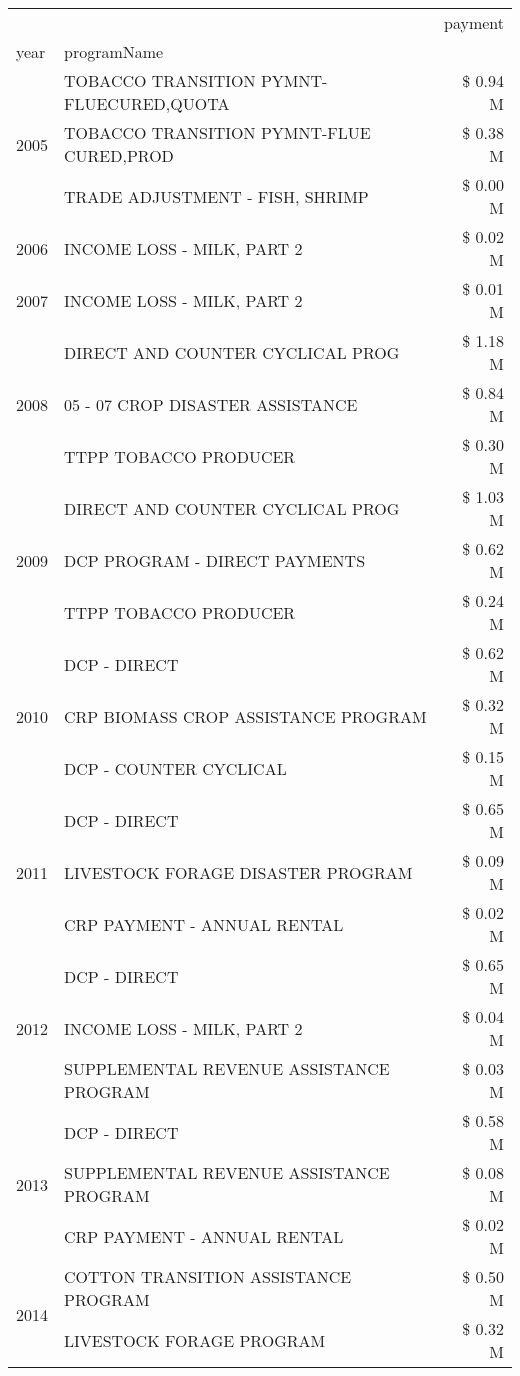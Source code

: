 \begin{tabular}{llr}
\toprule
 &  & payment \\
year & programName &  \\
\midrule
\multirow[t]{3}{*}{2005} & TOBACCO TRANSITION PYMNT-FLUECURED,QUOTA & \$ 0.94 M \\
 & TOBACCO TRANSITION PYMNT-FLUE CURED,PROD & \$ 0.38 M \\
 & TRADE ADJUSTMENT - FISH, SHRIMP & \$ 0.00 M \\
\cline{1-3}
2006 & INCOME LOSS - MILK, PART 2 & \$ 0.02 M \\
\cline{1-3}
2007 & INCOME LOSS - MILK, PART 2 & \$ 0.01 M \\
\cline{1-3}
\multirow[t]{3}{*}{2008} & DIRECT AND COUNTER CYCLICAL PROG & \$ 1.18 M \\
 & 05 - 07 CROP DISASTER ASSISTANCE & \$ 0.84 M \\
 & TTPP TOBACCO PRODUCER & \$ 0.30 M \\
\cline{1-3}
\multirow[t]{3}{*}{2009} & DIRECT AND COUNTER CYCLICAL PROG & \$ 1.03 M \\
 & DCP PROGRAM - DIRECT PAYMENTS & \$ 0.62 M \\
 & TTPP TOBACCO PRODUCER & \$ 0.24 M \\
\cline{1-3}
\multirow[t]{3}{*}{2010} & DCP - DIRECT & \$ 0.62 M \\
 & CRP BIOMASS CROP ASSISTANCE PROGRAM & \$ 0.32 M \\
 & DCP - COUNTER CYCLICAL & \$ 0.15 M \\
\cline{1-3}
\multirow[t]{3}{*}{2011} & DCP - DIRECT & \$ 0.65 M \\
 & LIVESTOCK FORAGE DISASTER PROGRAM & \$ 0.09 M \\
 & CRP PAYMENT - ANNUAL RENTAL & \$ 0.02 M \\
\cline{1-3}
\multirow[t]{3}{*}{2012} & DCP - DIRECT & \$ 0.65 M \\
 & INCOME LOSS - MILK, PART 2 & \$ 0.04 M \\
 & SUPPLEMENTAL REVENUE ASSISTANCE PROGRAM & \$ 0.03 M \\
\cline{1-3}
\multirow[t]{3}{*}{2013} & DCP - DIRECT & \$ 0.58 M \\
 & SUPPLEMENTAL REVENUE ASSISTANCE PROGRAM & \$ 0.08 M \\
 & CRP PAYMENT - ANNUAL RENTAL & \$ 0.02 M \\
\cline{1-3}
\multirow[t]{3}{*}{2014} & COTTON TRANSITION ASSISTANCE PROGRAM & \$ 0.50 M \\
 & LIVESTOCK FORAGE PROGRAM & \$ 0.32 M \\

\end{tabular}
